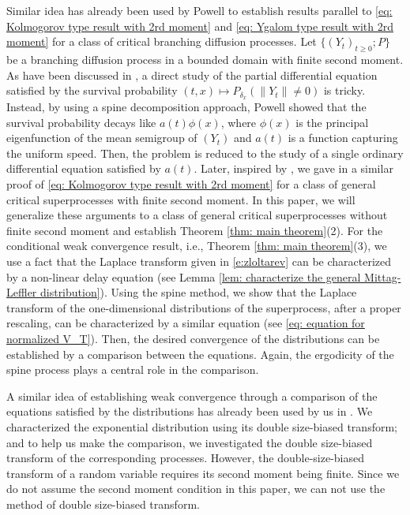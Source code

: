 \documentclass[12pt,a4paper]{amsart}
\theoremstyle{definition}
\numberwithin{equation}{section}
\begin{document}
Similar idea has already been used by Powell \cite{Powell2015An-invariance} to establish results parallel to \eqref{eq: Kolmogorov type result with 2rd moment} and \eqref{eq: Ygalom type result with 2rd moment} for a class of critical branching diffusion processes.
Let $\{(Y_t)_{t\geq 0}; P\}$ be a branching diffusion process in a bounded domain with finite second moment.
As have been discussed in \cite{Powell2015An-invariance}, a direct study of the partial differential equation satisfied by the survival probability $(t,x) \mapsto P_{\delta_x}(\|Y_t\| \neq 0)$ is tricky.
Instead, by using a spine decomposition approach, Powell \cite{Powell2015An-invariance} showed that the survival probability decays like $a(t)\phi(x)$, where $\phi(x)$ is the principal eigenfunction of the mean semigroup of $(Y_t)$ and $a(t)$ is a function capturing the uniform speed.
Then, the problem is reduced to the study of a single ordinary differential equation satisfied by $a(t)$.
Later, inspired by \cite{Powell2015An-invariance}, we gave in \cite{RenSongSun2017Spine} a similar proof of \eqref{eq: Kolmogorov type result with 2rd moment} for a class of general critical superprocesses with finite second moment.
In this paper, we will  generalize these arguments to a class of general critical superprocesses without finite second moment and establish Theorem \ref{thm: main theorem}(2).
For the conditional weak convergence result, i.e., Theorem \ref{thm: main theorem}(3), we use a fact that the Laplace transform given in \eqref{e:zloltarev} can be characterized by a non-linear delay equation (see Lemma \ref{lem: characterize the general Mittag-Leffler distribution}).
Using the spine method, we show that the Laplace transform of the one-dimensional distributions of the superprocess, after a proper rescaling, can be 	characterized by a similar equation (see \eqref{eq: equation for normalized V_T}).
Then, the desired convergence of the distributions can be established by a comparison between the equations.	
Again, the ergodicity of the spine process plays a central role in the comparison.
	
A similar idea of establishing weak convergence through a comparison of the equations satisfied by the distributions has already been used by us in \cite{RenSongSun2017A-2-spine, RenSongSun2017Spine}.
We characterized the exponential distribution using its double size-biased transform; and to help us make the comparison, we investigated the double size-biased transform of the corresponding processes.
However, the double-size-biased transform of a random variable requires its second moment being finite.
Since we do not assume the second moment condition in this paper, we can not use the method of double size-biased transform.
		
\end{document}
